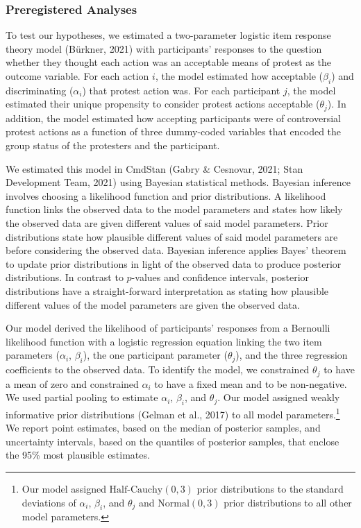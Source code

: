 \documentclass[twocolumn, 11pt, letterpaper]{article}
\begin{document}
\hypertarget{preregistered-analyses}{%
\subsubsection{Preregistered Analyses}\label{preregistered-analyses}}

To test our hypotheses, we estimated a two-parameter logistic item
response theory model (Bürkner, 2021) with participants' responses to
the question whether they thought each action was an acceptable means of
protest as the outcome variable. For each action \(i\), the model
estimated how acceptable (\(\beta_i\)) and discriminating (\(\alpha_i\))
that protest action was. For each participant \(j\), the model estimated
their unique propensity to consider protest actions acceptable
(\(\theta_j\)). In addition, the model estimated how accepting
participants were of controversial protest actions as a function of
three dummy-coded variables that encoded the group status of the
protesters and the participant.

We estimated this model in CmdStan (Gabry \& Cesnovar, 2021; Stan
Development Team, 2021) using Bayesian statistical methods. Bayesian
inference involves choosing a likelihood function and prior
distributions. A likelihood function links the observed data to the
model parameters and states how likely the observed data are given
different values of said model parameters. Prior distributions state how
plausible different values of said model parameters are before
considering the observed data. Bayesian inference applies Bayes' theorem
to update prior distributions in light of the observed data to produce
posterior distributions. In contrast to \(p\)-values and confidence
intervals, posterior distributions have a straight-forward
interpretation as stating how plausible different values of the model
parameters are given the observed data.

Our model derived the likelihood of participants' responses from a
Bernoulli likelihood function with a logistic regression equation
linking the two item parameters (\(\alpha_i\), \(\beta_i\)), the one
participant parameter (\(\theta_j\)), and the three regression
coefficients to the observed data. To identify the model, we constrained
\(\theta_j\) to have a mean of zero and constrained \(\alpha_i\) to have
a fixed mean and to be non-negative. We used partial pooling to estimate
\(\alpha_i\), \(\beta_i\), and \(\theta_j\). Our model assigned weakly
informative prior distributions (Gelman et al., 2017) to all model
parameters.\footnote{Our model assigned \(\text{Half-Cauchy} (0, 3)\)
  prior distributions to the standard deviations of \(\alpha_i\),
  \(\beta_i\), and \(\theta_j\) and \(\text{Normal} (0, 3)\) prior
  distributions to all other model parameters.} We report point
estimates, based on the median of posterior samples, and uncertainty
intervals, based on the quantiles of posterior samples, that enclose the
95\% most plausible estimates.
\end{document}
